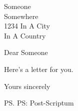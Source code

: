 \documentclass[psi]{scrlttr2}
\begin{document}
\begin{letter}{Someone\\
	Somewhere\\
	1234 In A City\\
	In A Country}
\opening{Dear Someone}
Here's a letter for you.
\closing{Yours sincerely}
\ps{PS: Post-Scriptum}
\end{letter}
\end{document}
